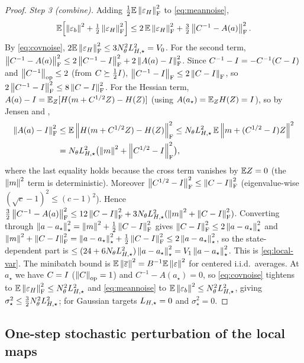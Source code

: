 \begin{proof}
\emph{Step 3 (combine).} Adding $\tfrac12\mathbb{E}\left\lVert \varepsilon_H\right\rVert_{\mathrm{F}}^2$ to \eqref{eq:meannoise},
\[
    \mathbb{E}\Bigl[\left\lVert \varepsilon_b\right\rVert^2+\tfrac12\left\lVert \varepsilon_H\right\rVert_{\mathrm{F}}^2\Bigr]
    \leq 2\,\mathbb{E}\left\lVert \varepsilon_H\right\rVert_{\mathrm{F}}^2+\tfrac32\left\lVert C^{-1}-A(a)\right\rVert_{\mathrm{F}}^2 .
\]
By \eqref{eq:covnoise}, $2\mathbb{E}\left\lVert \varepsilon_H\right\rVert_{\mathrm{F}}^2\leq3N_\theta^2L_{H,\star}^2=V_0$. For the second term,
$\left\lVert C^{-1}-A(a)\right\rVert_{\mathrm{F}}^2\leq2\left\lVert C^{-1}-I\right\rVert_{\mathrm{F}}^2+2\left\lVert A(a)-I\right\rVert_{\mathrm{F}}^2$. Since
$C^{-1}-I=-C^{-1}(C-I)$ and $\left\lVert C^{-1}\right\rVert_{\mathrm{op}}\leq2$ (from $C\succeq\tfrac12I$),
$\left\lVert C^{-1}-I\right\rVert_{\mathrm{F}}\leq2\left\lVert C-I\right\rVert_{\mathrm{F}}$, so $2\left\lVert C^{-1}-I\right\rVert_{\mathrm{F}}^2\leq8\left\lVert C-I\right\rVert_{\mathrm{F}}^2$.
For the Hessian term, $A(a)-I=\mathbb{E}_Z[H(m+C^{1/2}Z)-H(Z)]$ (using $A(a_\star)=\mathbb{E}_Z H(Z)=I$), so by
Jensen and ,
\[
\begin{split}
    \left\lVert A(a)-I\right\rVert_{\mathrm{F}}^2&\leq\mathbb{E}\left\lVert H(m+C^{1/2}Z)-H(Z)\right\rVert_{\mathrm{F}}^2
    \leq N_\theta L_{H,\star}^2\,\mathbb{E}\left\lVert m+(C^{1/2}-I)Z\right\rVert^2\\
    &=N_\theta L_{H,\star}^2\bigl(\left\lVert m\right\rVert^2+\left\lVert C^{1/2}-I\right\rVert_{\mathrm{F}}^2\bigr),
\end{split}
\]
where the last equality holds because the cross term vanishes by $\mathbb{E} Z=0$ (the $\left\lVert m\right\rVert^2$ term is
deterministic). Moreover $\left\lVert C^{1/2}-I\right\rVert_{\mathrm{F}}^2\leq\left\lVert C-I\right\rVert_{\mathrm{F}}^2$ (eigenvalue-wise
$(\sqrt c-1)^2\leq(c-1)^2$). Hence
$\tfrac32\left\lVert C^{-1}-A(a)\right\rVert_{\mathrm{F}}^2\leq12\left\lVert C-I\right\rVert_{\mathrm{F}}^2+3N_\theta L_{H,\star}^2(\left\lVert m\right\rVert^2+\left\lVert C-I\right\rVert_{\mathrm{F}}^2)$.
Converting through $\left\lVert a-a_\star\right\rVert_\star^2=\left\lVert m\right\rVert^2+\tfrac12\left\lVert C-I\right\rVert_{\mathrm{F}}^2$ gives
$\left\lVert C-I\right\rVert_{\mathrm{F}}^2\leq2\left\lVert a-a_\star\right\rVert_\star^2$ and
$\left\lVert m\right\rVert^2+\left\lVert C-I\right\rVert_{\mathrm{F}}^2=\left\lVert a-a_\star\right\rVert_\star^2+\tfrac12\left\lVert C-I\right\rVert_{\mathrm{F}}^2\leq2\left\lVert a-a_\star\right\rVert_\star^2$,
so the state-dependent part is $\leq(24+6N_\theta L_{H,\star}^2)\left\lVert a-a_\star\right\rVert_\star^2=V_1\left\lVert a-a_\star\right\rVert_\star^2$.
This is \eqref{eq:local-var}. The minibatch bound is $\mathbb{E}\left\lVert \overline\varepsilon\right\rVert^2=B^{-1}\mathbb{E}\left\lVert \varepsilon\right\rVert^2$
for centered i.i.d.\ averages. At $a_\star$ we have $C=I$ ($\left\lVert C\right\rVert_{\mathrm{op}}=1$) and
$C^{-1}-A(a_\star)=0$, so \eqref{eq:covnoise} tightens to $\mathbb{E}\left\lVert \varepsilon_H\right\rVert_{\mathrm{F}}^2\leq N_\theta^2L_{H,\star}^2$
and \eqref{eq:meannoise} to $\mathbb{E}\left\lVert \varepsilon_b\right\rVert^2\leq N_\theta^2L_{H,\star}^2$, giving
$\sigma_\star^2\leq\tfrac32N_\theta^2L_{H,\star}^2$; for Gaussian targets $L_{H,\star}=0$ and $\sigma_\star^2=0$.
\end{proof}

\subsection{One-step stochastic perturbation of the local maps}
\label{subsec:local-perturb}

